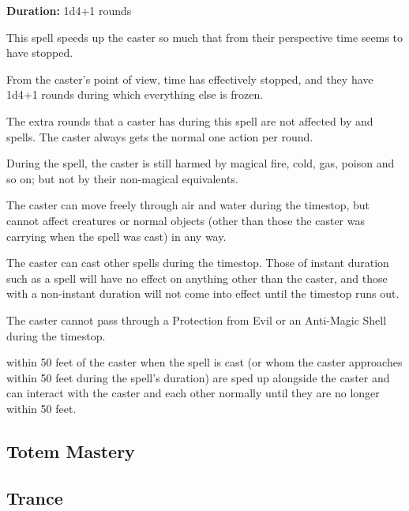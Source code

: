 \begin{multicols*}{2}
{\textbf{Duration:} 1d4+1 rounds}

This spell speeds up the caster so much that from their perspective time seems to have stopped.

From the caster’s point of view, time has effectively stopped, and they have 1d4+1 rounds during which everything else is frozen.

The extra rounds that a caster has during this spell are not affected by  and  spells. The caster always gets the normal one action per round.

During the spell, the caster is still harmed by magical fire, cold, gas, poison and so on; but not by their non-magical equivalents.

The caster can move freely through air and water during the timestop, but cannot affect creatures or normal objects (other than those the caster was carrying when the spell was cast) in any way.

The caster can cast other spells during the timestop. Those of instant duration such as a  spell will have no effect on anything other than the caster, and those with a non-instant duration will not come into effect until the timestop runs out.

The caster cannot pass through a Protection from Evil or an Anti-Magic Shell during the timestop.

 within 50 feet of the caster when the spell is cast (or whom the caster approaches within 50 feet during the spell’s duration) are sped up alongside the caster and can interact with the caster and each other normally until they are no longer within 50 feet.

\subsection{Totem Mastery}\label{spell:Totem Mastery}


\subsection{Trance}\label{spell:Trance}
\end{multicols*}
